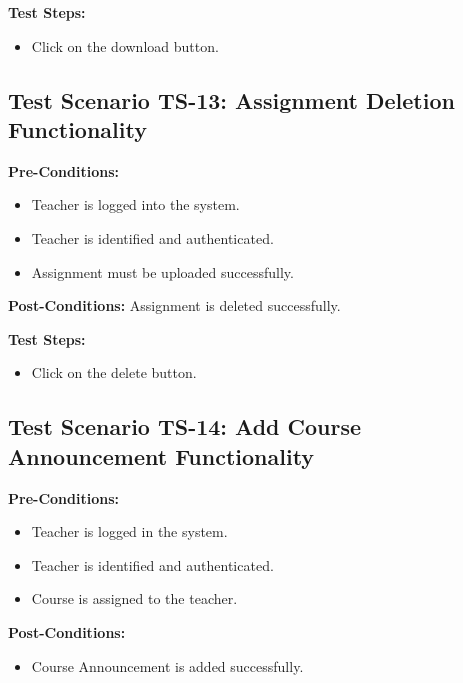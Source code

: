 \textbf{Test Steps:}
\begin{itemize}

\item Click on the download button.

\end{itemize}

\subsection{Test Scenario TS-13: Assignment Deletion Functionality}
\textbf{Pre-Conditions: }
\begin{itemize}

\item Teacher is logged into the system.
\item Teacher is identified and authenticated.
\item Assignment must be uploaded successfully.

\end{itemize}
\textbf{Post-Conditions: } Assignment is deleted successfully.

\textbf{Test Steps:}
\begin{itemize}

\item Click on the delete button.

\end{itemize}






\subsection{Test Scenario TS-14: Add Course Announcement Functionality}
\textbf{Pre-Conditions: }
\begin{itemize}

\item Teacher is logged in the system.
\item Teacher is identified and authenticated.
\item Course is assigned to the teacher.

\end{itemize}

\textbf{Post-Conditions: }
\begin{itemize}

\item Course Announcement is added successfully.

\end{itemize}


